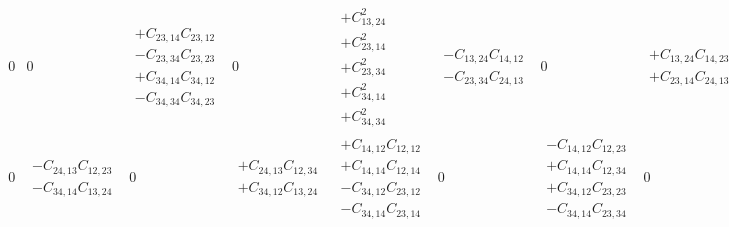 \documentclass[pra,nofootinbib]{revtex4-1}
\newcommand{\C}[2]{C_{{#1},{#2}}}
\begin{document}
\begin{eqnarray}
\begin{array}{cccccccccccccccc}
     0 &
     0 &
     \begin{array}{c}
     + \C{23}{14}\C{23}{12} \\
     - \C{23}{34}\C{23}{23} \\
     + \C{34}{14}\C{34}{12} \\
     - \C{34}{34}\C{34}{23} 
     \end{array} &
     0 &
     \begin{array}{c}
     + \C{13}{24}^2 \\
     + \C{23}{14}^2 \\
     + \C{23}{34}^2 \\
     + \C{34}{14}^2 \\
     + \C{34}{34}^2 
     \end{array} &
     \begin{array}{c}
     - \C{13}{24}\C{14}{12} \\
     - \C{23}{34}\C{24}{13} 
     \end{array} &
     0 &
     \begin{array}{c}
     + \C{13}{24}\C{14}{23} \\
     + \C{23}{14}\C{24}{13} 
     \end{array} &
     0 \\
     0 &
     \begin{array}{c}
     - \C{24}{13}\C{12}{23} \\
     - \C{34}{14}\C{13}{24} 
     \end{array} &
     0 &
     \begin{array}{c}
     + \C{24}{13}\C{12}{34} \\
     + \C{34}{12}\C{13}{24} 
     \end{array} &
     \begin{array}{c}
     + \C{14}{12}\C{12}{12} \\
     + \C{14}{14}\C{12}{14} \\
     - \C{34}{12}\C{23}{12} \\
     - \C{34}{14}\C{23}{14} 
     \end{array} &
     0 &
     \begin{array}{c}
     - \C{14}{12}\C{12}{23} \\
     + \C{14}{14}\C{12}{34} \\
     + \C{34}{12}\C{23}{23} \\
     - \C{34}{14}\C{23}{34} 
     \end{array} &
     0 &
     0 &
     \begin{array}{c}
     + \C{14}{14}\C{13}{24} \\

\end{array}
\end{array}
\end{eqnarray}
\end{document}
